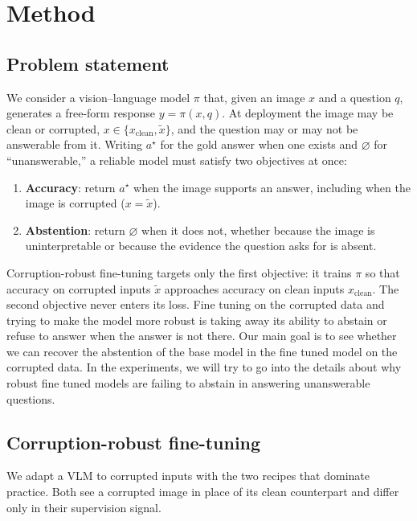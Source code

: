\documentclass[10pt,twocolumn,letterpaper]{article}
\begin{document}
\section{Method}
\label{sec:method}

\subsection{Problem statement}
\label{sec:problem}

We consider a vision--language model $\pi$ that, given an image $x$ and a question $q$,
generates a free-form response $y = \pi(x, q)$. At deployment the image may be clean or
corrupted, $x \in \{x_{\mathrm{clean}}, \tilde{x}\}$, and the question may or may not be
answerable from it. Writing $a^\star$ for the gold answer when one exists and $\varnothing$
for ``unanswerable,'' a reliable model must satisfy two objectives at once:
\begin{enumerate}
\item \textbf{Accuracy}: return $a^\star$ when the image supports an answer, including when
the image is corrupted ($x = \tilde{x}$).
\item \textbf{Abstention}: return $\varnothing$ when it does not, whether because the image
is uninterpretable or because the evidence the question asks for is absent.
\end{enumerate}
Corruption-robust fine-tuning targets only the first objective: it trains $\pi$ so that
accuracy on corrupted inputs $\tilde{x}$ approaches accuracy on clean inputs
$x_{\mathrm{clean}}$. The second objective never enters its loss. Fine tuning on the corrupted data and trying to make the model more robust is taking away its ability to abstain or refuse to answer when the answer is not there. Our main goal is to see whether we can recover the abstention of the base model in the fine tuned model on the corrupted data. In the experiments, we will try to go into the details about why robust fine tuned models are failing to abstain in answering unanswerable questions.
\subsection{Corruption-robust fine-tuning}
\label{sec:method-ft}

We adapt a VLM to corrupted inputs with the two recipes that dominate practice. Both see a
corrupted image in place of its clean counterpart and differ only in their supervision
signal.
\end{document}
